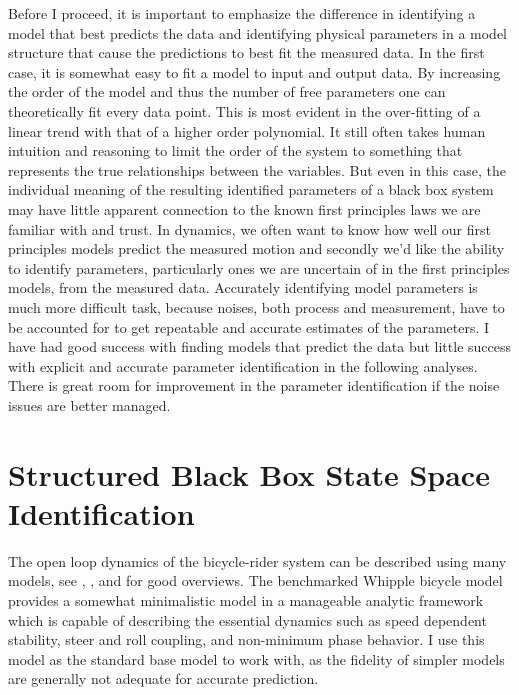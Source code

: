 \documentclass[a4paper]{article}
\begin{document}
Before I proceed, it is important to emphasize the difference in identifying a
model that best predicts the data and identifying physical parameters in a
model structure that cause the predictions to best fit the measured data. In
the first case, it is somewhat easy to fit a model to input and output data. By
increasing the order of the model and thus the number of free parameters one
can theoretically fit every data point. This is most evident in the
over-fitting of a linear trend with that of a higher order polynomial. It still
often takes human intuition and reasoning to limit the order of the system to
something that represents the true relationships between the variables. But
even in this case, the individual meaning of the resulting identified
parameters of a black box system may have little apparent connection to the
known first principles laws we are familiar with and trust. In dynamics, we
often want to know how well our first principles models predict the measured
motion and secondly we'd like the ability to identify parameters, particularly
ones we are uncertain of in the first principles models, from the measured
data. Accurately identifying model parameters is much more difficult task,
because noises, both process and measurement, have to be accounted for to get
repeatable and accurate estimates of the parameters. I have had good success
with finding models that predict the data but little success with explicit and
accurate parameter identification in the following analyses. There is great
room for improvement in the parameter identification if the noise issues are
better managed.

\section{Structured Black Box State Space Identification}

The open loop dynamics of the bicycle-rider system can be described using many
models, see \cite{Astrom2005}, \cite{Limebeer2006}, and \cite{Meijaard2007} for
good overviews. The benchmarked Whipple bicycle model \cite{Meijaard2007}
provides a somewhat minimalistic model in a manageable analytic framework which
is capable of describing the essential dynamics such as speed dependent
stability, steer and roll coupling, and non-minimum phase behavior. I use this
model as the standard base model to work with, as the fidelity of simpler
models are generally not adequate for accurate prediction.
\end{document}
